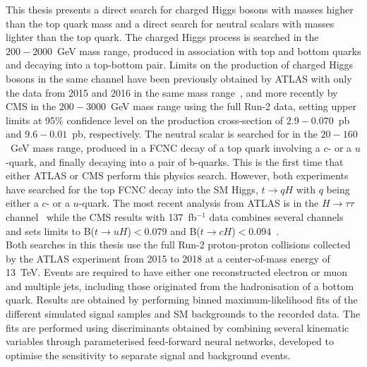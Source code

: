 This thesis presents a direct search for charged Higgs bosons with masses higher than the top quark mass and a direct search for neutral scalars with masses lighter than the top quark. The charged Higgs process is searched in the $200-2000$~GeV mass range, produced in association with top and bottom quarks and decaying into a top-bottom pair. Limits on the production of charged Higgs bosons in the same channel have been previously obtained by ATLAS with only the data from 2015 and 2016 in the same mass range~\cite{ATLASHptb2018}, and more recently by CMS in the $200-3000$~GeV mass range using the full Run-2 data, setting upper limits at 95\% confidence level on the production cross-section of $2.9-0.070$~pb and $9.6-0.01$~pb, respectively. The neutral scalar is searched for in the $20-160$~GeV mass range, produced in a FCNC decay of a top quark involving a $c$- or a $u$-quark, and finally decaying into a pair of b-quarks. This is the first time that either ATLAS or CMS perform this physics search. However, both experiments have searched for the top FCNC decay into the SM Higgs, $t\to qH$ with $q$ being either a $c$- or a $u$-quark. The most recent analysis from ATLAS is in the $H\to\tau\tau$ channel~\cite{ATLAStqHtautau} while the CMS results with 137~fb$^{-1}$ data combines several channels and sets limits to B($t\to uH$)$ < 0.079$ and B($t\to cH$)$ < 0.094$~\cite{CMStqHRun2}.\\

Both searches in this thesis use the full Run-2 proton-proton collisions collected by the ATLAS experiment from 2015 to 2018 at a center-of-mass energy of 13~TeV. Events are required to have either one reconstructed electron or muon and multiple jets, including those originated from the hadronisation of a bottom quark. Results are obtained by performing binned maximum-likelihood fits of the different simulated signal samples and SM backgrounds to the recorded data. The fits are performed using discriminants obtained by combining several kinematic variables through parameterised feed-forward neural networks, developed to optimise the sensitivity to separate signal and background events.\\

